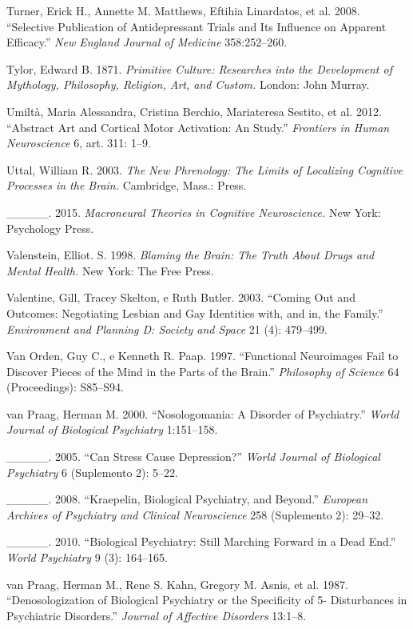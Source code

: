 {\begin{Parskip}
Turner, Erick H., Annette M. Matthews, Eftihia Linardatos, et al. 2008.
``Selective Publication of Antidepressant Trials and Its Influence on
Apparent Efficacy.'' \emph{New England Journal of Medicine}
358:252--260.

Tylor, Edward B. 1871. \emph{Primitive Culture: Researches into the
Development of Mythology, Philosophy, Religion, Art, and Custom.}
London: John Murray.

Umiltà, Maria Alessandra, Cristina Berchio, Mariateresa Sestito, et al.
2012. ``Abstract Art and Cortical Motor Activation: An  Study.''
\emph{Frontiers in Human Neuroscience} 6, art. 311: 1--9.

Uttal, William R. 2003. \emph{The New Phrenology: The Limits of
Localizing Cognitive Processes in the Brain.} Cambridge, Mass.: 
Press.

\_\_\_\_\_. 2015. \emph{Macroneural Theories in Cognitive Neuroscience.}
New York: Psychology Press.

Valenstein, Elliot. S. 1998. \emph{Blaming the Brain: The Truth About
Drugs and Mental Health.} New York: The Free Press.

Valentine, Gill, Tracey Skelton, e Ruth Butler. 2003. ``Coming Out and
Outcomes: Negotiating Lesbian and Gay Identities with, and in, the
Family.'' \emph{Environment and Planning D: Society and Space} 21 (4):
479--499.

Van Orden, Guy C., e Kenneth R. Paap. 1997. ``Functional Neuroimages
Fail to Discover Pieces of the Mind in the Parts of the Brain.''
\emph{Philosophy of Science} 64 (Proceedings): S85--S94.

van Praag, Herman M. 2000. ``Nosologomania: A Disorder of Psychiatry.''
\emph{World Journal of Biological Psychiatry} 1:151--158.

\_\_\_\_\_. 2005. ``Can Stress Cause Depression?'' \emph{World Journal of
Biological Psychiatry} 6 (Suplemento 2): 5--22.

\_\_\_\_\_. 2008. ``Kraepelin, Biological Psychiatry, and Beyond.''
\emph{European Archives of Psychiatry and Clinical Neuroscience} 258
(Suplemento 2): 29--32.

\_\_\_\_\_. 2010. ``Biological Psychiatry: Still Marching Forward in a
Dead End.'' \emph{World Psychiatry} 9 (3): 164--165.

van Praag, Herman M., Rene S. Kahn, Gregory M. Asnis, et al. 1987.
``Denosologization of Biological Psychiatry or the Specificity of 5-
Disturbances in Psychiatric Disorders.'' \emph{Journal of Affective
Disorders} 13:1--8.


\end{Parskip}}
